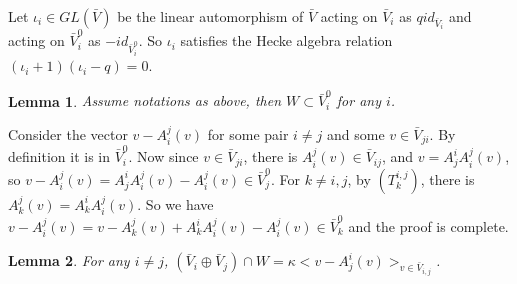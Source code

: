 \def\CTEXPreproc{Created by ctex v0.2.12, don't edit!}\documentclass[11pt]{article}
\newtheorem{lem}{Lemma}[section]
\begin{document}
Let $\iota _i \in GL( \bar{V})$ be the linear automorphism of $\bar{V}$ acting on $\bar{V}_i$ as $q id_{\bar{V}_i }$ and acting on $\bar{V}^0 _i $ as $-id_{\bar{V}^0 _i }$. So $\iota_i $ satisfies the Hecke algebra relation $(\iota_i +1)(\iota_i -q)=0$.






\begin{lem} Assume notations as above, then  $W\subset \bar{V}^0 _i $ for any $i$.

\end{lem}

\begin{pf}
Consider the vector $v-A^j _i (v)$ for some pair $i\neq j$ and some $v\in \bar{V}_{ji}$. By definition it is in $\bar{V}^0 _i $. Now since $v\in \bar{V}_{ji}$, there is $A^j _i (v) \in \bar{V}_{ij}$, and $ v= A^i _j A^j _i (v) $, so $v-A^j _i (v)=  A^i _j A^j _i (v)-A^j _i (v) \in \bar{V}^0 _j$.   For $k\neq i,j$,
 by $(T^{i,j}_k )$, there is $A^j _k (v) = A^i _k A^j _i (v)$. So we have $v-A^j _i (v)= v-A^j _k (v) + A^i _k A^j _i (v) -A^j _i (v) \in \bar{V}^0 _k $ and the proof is complete.


\end{pf}



\begin{lem}
For any $i\neq j$, $( \bar{V}_i \oplus \bar{V}_j  ) \cap W = \kappa < v-A^i _j (v)   >_{v\in \bar{V}_{i,j}}$.

\end{lem}
\end{document}
